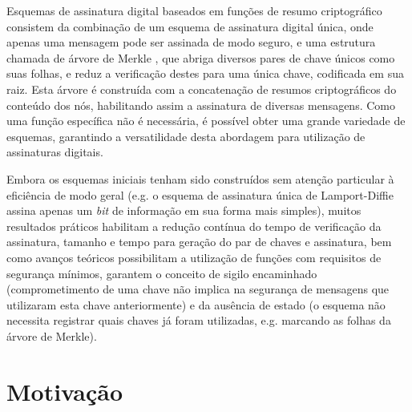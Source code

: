\documentclass{article}
\begin{document}
Esquemas de assinatura digital baseados em funções de resumo criptográfico
consistem da combinação de um esquema de assinatura digital única, onde
apenas uma mensagem pode ser assinada de modo seguro, e uma estrutura
chamada de árvore de Merkle \cite{Merkle:1989:CDS:118209.118230}, que abriga diversos pares
de chave únicos como suas folhas, e reduz a verificação destes para uma
única chave, codificada em sua raiz. Esta árvore é construída com a
concatenação de resumos criptográficos do conteúdo dos nós, habilitando
assim a assinatura de diversas mensagens. Como uma função específica não é
necessária, é possível obter uma grande variedade de esquemas, garantindo
a versatilidade desta abordagem para utilização de assinaturas digitais.

Embora os esquemas iniciais tenham sido construídos sem atenção particular
à eficiência de modo geral (e.g. o esquema de assinatura única de
Lamport-Diffie \cite{Lamport1979} assina apenas um \emph{bit} de informação
em sua forma mais simples), muitos resultados práticos habilitam a redução
contínua do tempo de verificação da assinatura, tamanho e tempo para
geração do par de chaves e assinatura, bem como avanços teóricos possibilitam
a utilização de funções com requisitos de segurança mínimos, garantem o conceito de sigilo encaminhado \cite{Buchmann2011}
(comprometimento de uma chave não implica na segurança de mensagens que
utilizaram esta chave anteriormente) e da ausência de estado \cite{Bernstein2015} (o esquema não
necessita registrar quais chaves já foram utilizadas, e.g. marcando as folhas
da árvore de Merkle).

\section{Motivação}





\end{document}
